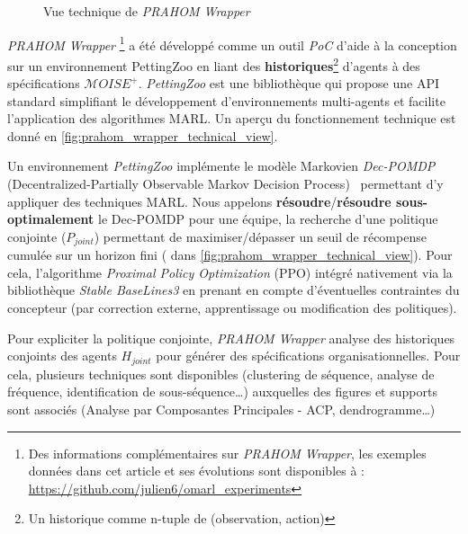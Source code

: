 \documentclass[demonstration]{jfsma}
\newcommand{\jp}[1]{\textbf{\color{red} JPJ: #1}}
\begin{document}
\begin{figure}[h!]
  \centering
  
  \caption{Vue technique de \emph{PRAHOM Wrapper}}
  \label{fig:prahom_wrapper_technical_view}
\end{figure}

\emph{PRAHOM Wrapper}\label{PettingZoo-wrapper}
\footnote{Des informations complémentaires sur \emph{PRAHOM Wrapper}, les exemples données dans cet article et ses évolutions sont disponibles à : \url{https://github.com/julien6/omarl_experiments}}
a été développé comme un outil \emph{PoC} d'aide à la conception sur un environnement PettingZoo en liant des \textbf{historiques}\footnote{Un historique comme n-tuple de (observation, action)} d'agents à des spécifications $\mathcal{M}OISE^+$. \emph{PettingZoo} est une bibliothèque qui propose une API standard simplifiant le développement d'environnements multi-agents et facilite l'application des algorithmes MARL. Un aperçu du fonctionnement technique est donné en \autoref{fig:prahom_wrapper_technical_view}. 

Un environnement
\emph{PettingZoo} implémente le modèle Markovien \emph{Dec-POMDP} (Decentralized-Partially Observable Markov Decision Process)~\cite{Oliehoek2016} permettant d'y appliquer
des techniques MARL. 
Nous appelons \textbf{résoudre}/\textbf{résoudre sous-optimalement} le Dec-POMDP pour une équipe, la recherche d'une politique conjointe ($P_{joint}$) permettant de maximiser/dépasser un seuil de récompense cumulée sur un horizon fini ( dans \autoref{fig:prahom_wrapper_technical_view}). Pour cela, l'algorithme \emph{Proximal Policy Optimization} (PPO) intégré nativement via la bibliothèque \emph{Stable BaseLines3} en prenant en compte d'éventuelles contraintes du concepteur (par correction externe, apprentissage ou modification des politiques).


Pour expliciter la politique conjointe, \emph{PRAHOM Wrapper} analyse des historiques conjoints des agents $H_{joint}$ pour générer des spécifications organisationnelles. Pour cela, plusieurs techniques sont disponibles (clustering de séquence, analyse de fréquence, identification de sous-séquence\dots) auxquelles des figures et supports sont associés (Analyse par Composantes Principales - ACP, dendrogramme\dots)
\end{document}
